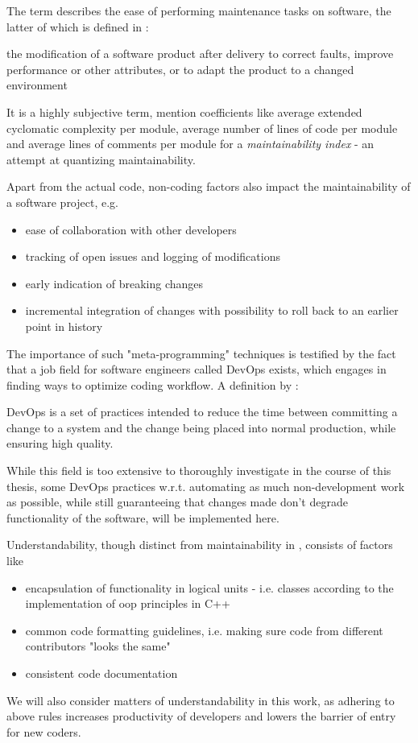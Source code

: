 The term describes the ease of performing maintenance tasks on software, the latter of which is defined in \citet[p.234]{Bray1997} :
\begin{definition}[maintenance]
the modification of a software product after delivery to correct faults, improve performance or other attributes, or to adapt the product to a changed environment
\end{definition}

It is a highly subjective term, \citet[p.231]{Bray1997} mention coefficients like average extended cyclomatic complexity per module, average number of lines of code per module and average lines of comments per module for a \textit{maintainability index} - an attempt at quantizing maintainability.

Apart from the actual code, non-coding factors also impact the maintainability of a software project, e.g.
\begin{itemize}
	\item ease of collaboration with other developers
	\item tracking of open issues and logging of modifications
	\item early indication of breaking changes
	\item incremental integration of changes with possibility to roll back to an earlier point in history
\end{itemize}

The importance of such "meta-programming" techniques is testified by the fact that a job field for software engineers called \gls{DevOps} exists, which engages in finding ways to optimize coding workflow.
A definition by \citet[p.23]{Bass2015}:
\begin{definition}[DevOps]
	DevOps is a set of practices intended to reduce the time between committing a change to a system and the change being placed into normal production, while ensuring high quality.
\end{definition}

While this field is too extensive to thoroughly investigate in the course of this thesis, some DevOps practices w.r.t. automating as much non-development work as possible, while still guaranteeing that changes made don't degrade functionality of the software, will be implemented here. 

Understandability, though distinct from maintainability in \citet{Bray1997}, consists of factors like 
\begin{itemize}
	\item encapsulation of functionality in logical units - i.e. classes according to the implementation of \gls{oop} principles in C++
	\item common code formatting guidelines, i.e. making sure code from different contributors "looks the same"
	\item consistent code documentation
\end{itemize}
We will also consider matters of understandability in this work, as adhering to above rules increases productivity of developers and lowers the barrier of entry for new coders.

